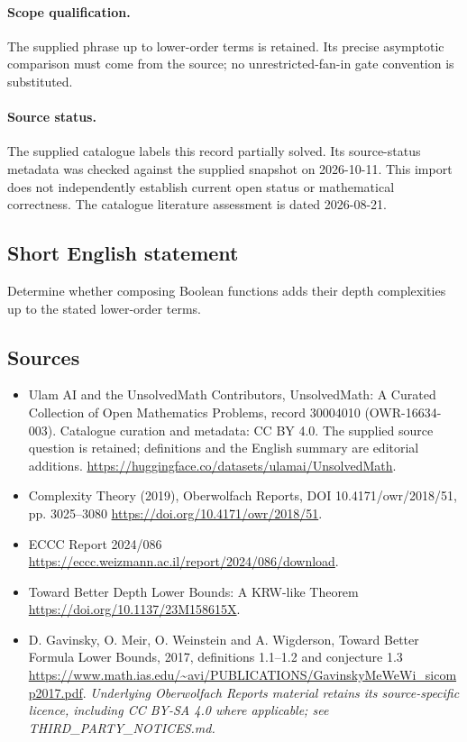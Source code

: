 \documentclass[11pt]{article}
\begin{document}
\paragraph{Scope qualification.}
The supplied phrase up to lower-order terms is retained. Its precise asymptotic comparison must come from the source; no unrestricted-fan-in gate convention is substituted.
\paragraph{Source status.}
The supplied catalogue labels this record partially solved. Its source-status metadata was checked against the supplied snapshot on 2026-10-11. This import does not independently establish current open status or mathematical correctness. The catalogue literature assessment is dated 2026-08-21.
\subsection{Short English statement}
Determine whether composing Boolean functions adds their depth complexities up to the stated lower-order terms.
\subsection{Sources}
\begin{itemize}
\item[S1] Ulam AI and the UnsolvedMath Contributors, UnsolvedMath: A Curated Collection of Open Mathematics Problems, record 30004010 (OWR-16634-003). Catalogue curation and metadata: CC BY 4.0. The supplied source question is retained; definitions and the English summary are editorial additions.
\url{https://huggingface.co/datasets/ulamai/UnsolvedMath}.
\item[S2] Complexity Theory (2019), Oberwolfach Reports, DOI 10.4171/owr/2018/51, pp. 3025--3080
\url{https://doi.org/10.4171/owr/2018/51}.
\item[S3] ECCC Report 2024/086
\url{https://eccc.weizmann.ac.il/report/2024/086/download}.
\item[S4] Toward Better Depth Lower Bounds: A KRW-like Theorem
\url{https://doi.org/10.1137/23M158615X}.
\item[S5] D. Gavinsky, O. Meir, O. Weinstein and A. Wigderson, Toward Better Formula Lower Bounds, 2017, definitions 1.1--1.2 and conjecture 1.3
\url{https://www.math.ias.edu/~avi/PUBLICATIONS/GavinskyMeWeWi_sicomp2017.pdf}.
\textit{Underlying Oberwolfach Reports material retains its source-specific licence, including CC BY-SA 4.0 where applicable; see THIRD\_PARTY\_NOTICES.md.}
\end{itemize}
\end{document}
